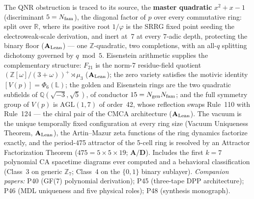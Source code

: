 \documentclass[11pt]{article}
\newcommand{\CatAL}{\ensuremath{\textbf{A}_{\rm Lean}}}
\newcommand{\CatAD}{\textbf{A/D}}
\begin{document}
The QNR obstruction is traced to its source, the \textbf{master quadratic}
$x^2+x-1$ (discriminant $5 = N_{\rm fam}$), the diagonal factor of $p$ over every
commutative ring: split over $\mathbb{R}$, where its positive root $1/\varphi$ is
the SRRG fixed point seeding the electroweak-scale derivation, and inert at~7 at
every $7$-adic depth, protecting the binary floor ($\CatAL$) --- one
$\mathbb{Z}$-quadratic, two completions, with an all-$q$ splitting dichotomy
governed by $q \bmod 5$.  Eisenstein arithmetic supplies the complementary
structure: $F_{21}$ is the norm-7 residue-field quotient
$(\mathbb{Z}[\omega]/(3{+}\omega))^{+} \rtimes \mu_3$ ($\CatAL$); the zero variety
satisfies the motivic identity $[V(p)] = \Phi_6(\mathbb{L})$; the golden and
Eisenstein rings are the two quadratic subfields of
$\mathbb{Q}(\sqrt{-3},\sqrt{5})$, of conductor $15 = N_{\rm gen}N_{\rm fam}$; and
the full symmetry group of $V(p)$ is $\mathrm{AGL}(1,7)$ of order~42, whose
reflection swaps Rule~110 with Rule~124 --- the chiral pair of the CMCA
architecture ($\CatAL$).  The vacuum is the unique temporally fixed configuration
at every ring size (Vacuum Uniqueness Theorem, $\CatAL$), the Artin--Mazur zeta
functions of the ring dynamics factorize exactly, and the period-475 attractor of
the 5-cell ring is resolved by an Attractor Factorization Theorem
($475 = 5\times5\times19$; $\CatAD$).
Includes the first $k=7$ polynomial CA spacetime diagrams ever computed and a behavioral
classification (Class~3 on generic $\mathbb{Z}_7$; Class~4 on the $\{0,1\}$ binary sublayer).
\emph{Companion papers:} P40 (GF(7) polynomial derivation); P45 (three-tape DPP architecture);
P46 (MDL uniqueness and five physical roles); P48 (synthesis monograph).
\end{document}
